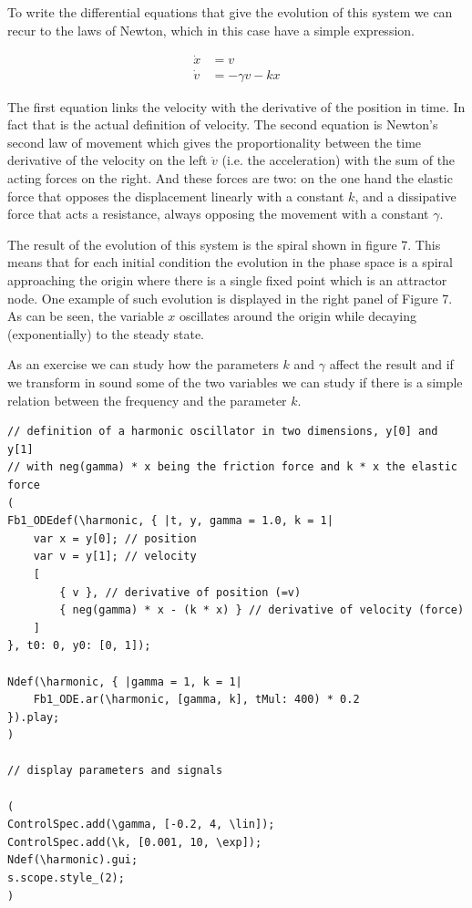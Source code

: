 \documentclass{article}
\begin{document}
To write the differential equations that give the evolution of this system we can recur to the laws of Newton, which in this case have a simple expression. 

\begin{subequations} \label{eq_harmosc}
\begin{align}
    \dot{x} & = v \\
    \dot{v} & = -\gamma v -kx 
\end{align}
\end{subequations}

The first equation links the velocity with the derivative of the position in time. 
In fact that is the actual definition of velocity. 
The second equation is Newton's second law of movement which gives the proportionality between the time derivative of the velocity on the left $\dot v$ (i.e. the acceleration) with the sum of the acting forces on the right. 
And these forces are two: on the one hand the elastic force that opposes the displacement linearly with a constant $k$, and a dissipative force that acts a resistance, always opposing the movement with a constant $\gamma$.

The result of the evolution of this system is the spiral shown in figure 7. 
This means that for each initial condition the evolution in the phase space is a spiral approaching the origin where there is a single fixed point which is an attractor node. One example of such evolution is displayed in the right panel of Figure 7. As can be seen, the variable $x$ oscillates around the origin while decaying (exponentially) to the steady state.

As an exercise we can study how the parameters $k$ and $\gamma$ affect the result and if we transform in sound some of the two variables we can study if there is a simple relation between the frequency and the parameter $k$.
\newpage

\begin{lstlisting}[frame=single,caption=A harmonic oscillator.]
// definition of a harmonic oscillator in two dimensions, y[0] and y[1]
// with neg(gamma) * x being the friction force and k * x the elastic force
(
Fb1_ODEdef(\harmonic, { |t, y, gamma = 1.0, k = 1|
	var x = y[0]; // position
	var v = y[1]; // velocity
	[
		{ v }, // derivative of position (=v)
		{ neg(gamma) * x - (k * x) } // derivative of velocity (force)
	]
}, t0: 0, y0: [0, 1]);

Ndef(\harmonic, { |gamma = 1, k = 1|
	Fb1_ODE.ar(\harmonic, [gamma, k], tMul: 400) * 0.2
}).play;
)

// display parameters and signals

(
ControlSpec.add(\gamma, [-0.2, 4, \lin]);
ControlSpec.add(\k, [0.001, 10, \exp]);
Ndef(\harmonic).gui;
s.scope.style_(2);
)

\end{lstlisting}
\end{document}
